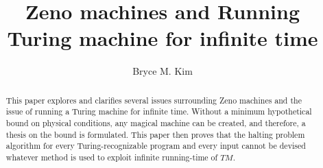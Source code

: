 \documentclass{roffin}
\begin{document}
\author{Bryce M. Kim}
\title{Zeno machines and Running Turing machine for infinite time}

\maketitle

\begin{abstract}
This paper explores and clarifies several issues surrounding Zeno machines and the issue of running a Turing machine for infinite time. Without a minimum hypothetical bound on physical conditions, any magical machine can be created, and therefore, a thesis on the bound is formulated. This paper then proves that the halting problem algorithm for every Turing-recognizable program and every input cannot be devised whatever method is used to exploit infinite running-time of $TM$.
\end{abstract}
\end{document}
